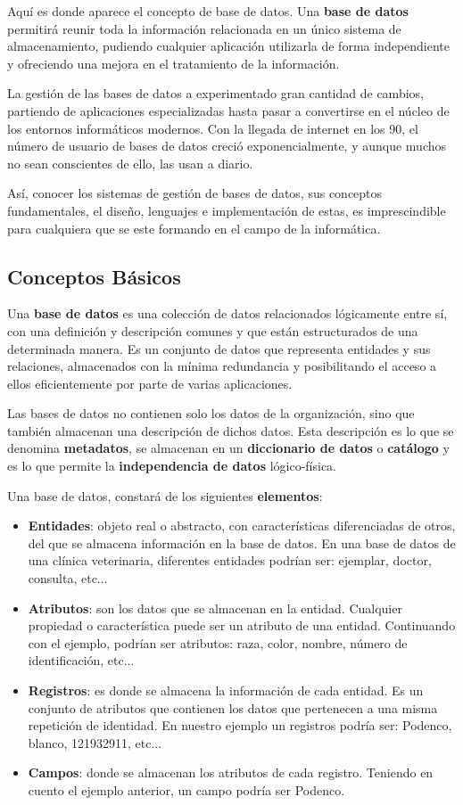 Aquí es donde aparece el concepto de base de datos. Una \textbf{base de datos} permitirá reunir toda la información relacionada en un único sistema de almacenamiento, pudiendo cualquier aplicación utilizarla de forma independiente y ofreciendo una mejora en el tratamiento de la información.

La gestión de las bases de datos a experimentado gran cantidad de cambios, partiendo de aplicaciones especializadas hasta pasar a convertirse en el núcleo de los entornos informáticos modernos. Con la llegada de internet en los 90, el número de usuario de bases de datos creció exponencialmente, y aunque muchos no sean conscientes de ello, las usan a diario.

Así, conocer los sistemas de gestión de bases de datos, sus conceptos fundamentales, el diseño, lenguajes e implementación de estas, es imprescindible para cualquiera que se este formando en el campo de la informática.

\subsection{Conceptos Básicos}
Una \textbf{base de datos} es una colección de datos relacionados lógicamente entre sí, con una definición y descripción comunes y que están estructurados de una determinada manera. Es un conjunto de datos que representa entidades y sus relaciones, almacenados con la mínima redundancia y posibilitando el acceso a ellos eficientemente por parte de varias aplicaciones.

Las bases de datos no contienen solo los datos de la organización, sino que también almacenan una descripción de dichos datos. Esta descripción es lo que se denomina \textbf{metadatos}, se almacenan en un \textbf{diccionario de datos} o \textbf{catálogo} y es lo que permite la \textbf{independencia de datos} lógico-física.

Una base de datos, constará de los siguientes \textbf{elementos}:
\begin{itemize}
    \item \textbf{Entidades}: objeto real o abstracto, con características diferenciadas de otros, del que se almacena información en la base de datos. En una base de datos de una clínica veterinaria, diferentes entidades podrían ser: ejemplar, doctor, consulta, etc...
    \item \textbf{Atributos}: son los datos que se almacenan en la entidad. Cualquier propiedad o característica puede ser un atributo de una entidad. Continuando con el ejemplo, podrían ser atributos: raza, color, nombre, número de identificación, etc...
    \item \textbf{Registros}: es donde se almacena la información de cada entidad. Es un conjunto de atributos que contienen los datos que pertenecen a una misma repetición de identidad. En nuestro ejemplo un registros podría ser: Podenco, blanco, 121932911, etc...
    \item \textbf{Campos}: donde se almacenan los atributos de cada registro. Teniendo en cuento el ejemplo anterior, un campo podría ser Podenco.
\end{itemize}

